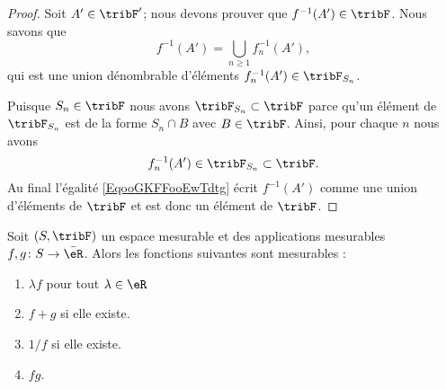 \begin{proof}
    Soit \( A'\in\tribF'\); nous devons prouver que \( f^{-1}(A')\in \tribF\). Nous savons que
    \begin{equation}        \label{EqooGKFFooEwTdtg}
        f^{-1}(A')=\bigcup_{n\geq 1}f_n^{-1}(A'),
    \end{equation}
    qui est une union dénombrable d'éléments \( f_n^{-1}(A')\in\tribF_{S_n}\).

    Puisque \( S_n\in \tribF\) nous avons \( \tribF_{S_n}\subset\tribF\) parce qu'un élément de \( \tribF_{S_n}\) est de la forme \( S_n\cap B\) avec \( B\in\tribF\). Ainsi, pour chaque \( n\) nous avons
    \begin{equation}
        f_n^{-1}(A')\in\tribF_{S_n}\subset \tribF.
    \end{equation}
    Au final l'égalité \eqref{EqooGKFFooEwTdtg} écrit \( f^{-1}(A')\) comme une union d'éléments de \( \tribF\) et est donc un élément de \( \tribF\).
\end{proof}

\begin{proposition}     \label{PROPooODDVooEEmmTX}
    Soit \( (S,\tribF)\) un espace mesurable et des applications mesurables \( f,g\colon S\to \bar \eR\). Alors les fonctions suivantes sont mesurables :
    \begin{enumerate}
        \item
            \( \lambda f\) pour tout \( \lambda\in \eR\)
        \item
            \( f+g\) si elle existe.
        \item
            \( 1/f\) si elle existe.
        \item
            \( fg\).
    \end{enumerate}
\end{proposition}

